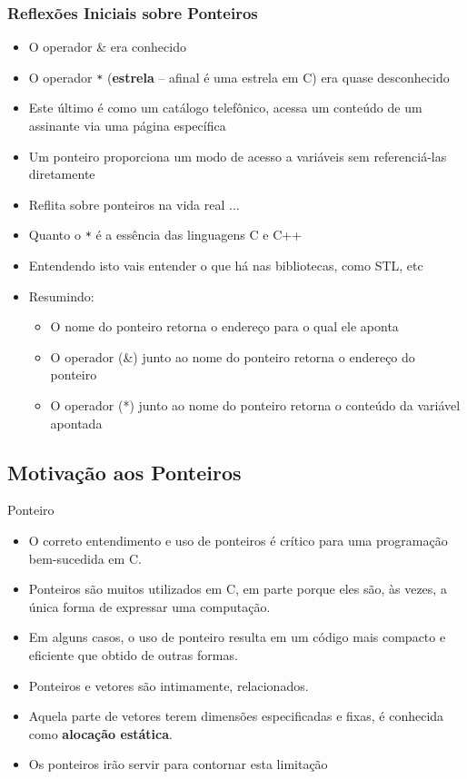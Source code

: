 \begin{frame}[c,fragile]%

\frametitle{Reflexões Iniciais sobre Ponteiros}

  \begin{itemize}[<+->]
   \item O operador \& era conhecido 
    \item O operador \texttt{*} (\textbf{estrela} -- afinal é uma estrela em C) era quase desconhecido
    \item Este  último é como um catálogo telefônico, acessa um conteúdo de um assinante via uma página específica
      \item Um ponteiro proporciona um modo de acesso a variáveis sem referenciá-las diretamente
    \item Reflita sobre ponteiros na vida real ... 
  \item Quanto o \texttt{*} é a essência das linguagens C e C++
  \item Entendendo isto vais entender o que há nas bibliotecas, como STL, etc
  \item Resumindo: 
  \pause
  \begin{itemize}
      \item O nome do ponteiro retorna o endereço para o qual ele aponta
      \item O operador (\&) junto ao nome  do ponteiro retorna o endereço do ponteiro
      \item O operador (*) junto ao nome do ponteiro retorna o conteúdo da variável apontada
    \end{itemize}
  \end{itemize}
  
\end{frame}




\subsection{Motivação aos Ponteiros}

\begin{frame}[c]{Ponteiro}

  \begin{itemize}[<+->]
  \item O correto entendimento e uso de ponteiros é crítico para uma programação bem-sucedida em C.
  \item Ponteiros são muitos utilizados em C, em parte porque eles são, às vezes, a única forma de expressar uma computação.
  \item Em alguns casos, o uso de ponteiro resulta em um código mais compacto e eficiente que obtido de outras formas.
  \item Ponteiros e vetores são intimamente, relacionados.  
  \item Aquela parte  de vetores terem dimensões especificadas e fixas, é conhecida como
 \textbf{alocação estática}.
  \item Os ponteiros irão servir para contornar esta limitação
  \end{itemize}
  
\end{frame}


